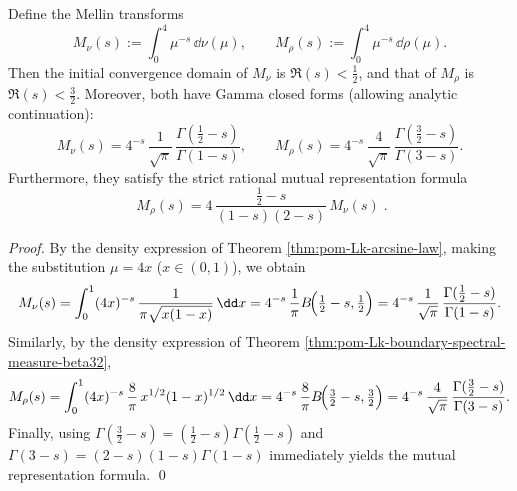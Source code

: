 \begin{proposition}\label{prop:pom-Lk-mellin-transform-rigidity}
Define the Mellin transforms
\[
M_\nu(s):=\int_{0}^{4}\mu^{-s}\,\dd\nu(\mu),
\qquad
M_\rho(s):=\int_{0}^{4}\mu^{-s}\,\dd\rho(\mu).
\]
Then the initial convergence domain of \(M_\nu\) is \(\Re(s)<\tfrac12\), and that of \(M_\rho\) is \(\Re(s)<\tfrac32\).
Moreover, both have Gamma closed forms (allowing analytic continuation):
\[
M_\nu(s)=4^{-s}\,\frac{1}{\sqrt\pi}\,\frac{\Gamma(\tfrac12-s)}{\Gamma(1-s)},
\qquad
M_\rho(s)=4^{-s}\,\frac{4}{\sqrt\pi}\,\frac{\Gamma(\tfrac32-s)}{\Gamma(3-s)}.
\]
Furthermore, they satisfy the strict rational mutual representation formula
\[
\boxed{\;
M_\rho(s)=4\,\frac{\tfrac12-s}{(1-s)(2-s)}\,M_\nu(s)\; }.
\]
\end{proposition}
\begin{proof}
By the density expression of Theorem \ref{thm:pom-Lk-arcsine-law}, making the substitution \(\mu=4x\) (\(x\in(0,1)\)), we obtain
\[
M_\nu(s)
=\int_{0}^{1}(4x)^{-s}\,\frac{1}{\pi\sqrt{x(1-x)}}\,\dd x
=4^{-s}\,\frac{1}{\pi}B\!\Bigl(\tfrac12-s,\tfrac12\Bigr)
=4^{-s}\,\frac{1}{\sqrt\pi}\,\frac{\Gamma(\tfrac12-s)}{\Gamma(1-s)}.

\]
Similarly, by the density expression of Theorem \ref{thm:pom-Lk-boundary-spectral-measure-beta32},
\[
M_\rho(s)
=\int_{0}^{1}(4x)^{-s}\,\frac{8}{\pi}\,x^{1/2}(1-x)^{1/2}\,\dd x
=4^{-s}\,\frac{8}{\pi}B\!\Bigl(\tfrac32-s,\tfrac32\Bigr)
=4^{-s}\,\frac{4}{\sqrt\pi}\,\frac{\Gamma(\tfrac32-s)}{\Gamma(3-s)}.
\]
Finally, using \(\Gamma(\tfrac32-s)=(\tfrac12-s)\Gamma(\tfrac12-s)\) and \(\Gamma(3-s)=(2-s)(1-s)\Gamma(1-s)\) immediately yields the mutual representation formula. \qed
\end{proof}
